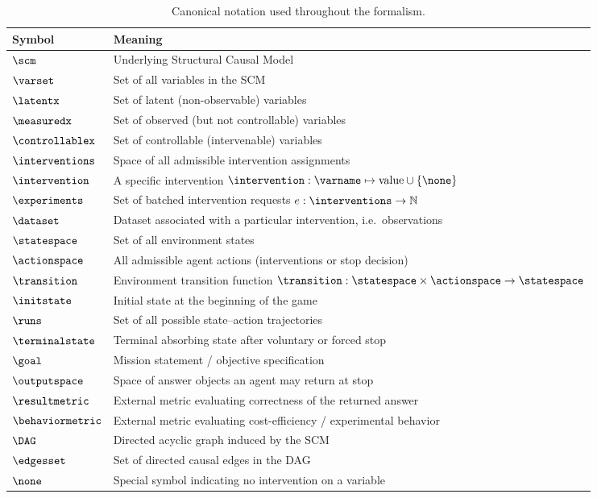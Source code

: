\begin{table}[h!]
\centering
\renewcommand{\arraystretch}{1.15}
\begin{tabular}{ll}
\toprule
\textbf{Symbol} & \textbf{Meaning} \\
\midrule
$\scm$ & Underlying Structural Causal Model \\
$\varset$ & Set of all variables in the SCM \\
$\latentx$ & Set of latent (non-observable) variables \\
$\measuredx$ & Set of observed (but not controllable) variables \\
$\controllablex$ & Set of controllable (intervenable) variables \\
$\interventions$ & Space of all admissible intervention assignments \\
$\intervention$ & A specific intervention $\intervention : \varname \mapsto \text{value} \cup \{\none\}$ \\
$\experiments$ & Set of batched intervention requests $e : \interventions \to \mathbb{N}$ \\
$\dataset$ & Dataset associated with a particular intervention, i.e.\ observations \\
$\statespace$ & Set of all environment states \\
$\actionspace$ & All admissible agent actions (interventions or stop decision) \\
$\transition$ & Environment transition function $\transition : \statespace \times \actionspace \to \statespace$ \\
$\initstate$ & Initial state at the beginning of the game \\
$\runs$ & Set of all possible state--action trajectories \\
$\terminalstate$ & Terminal absorbing state after voluntary or forced stop \\
$\goal$ & Mission statement / objective specification \\
$\outputspace$ & Space of answer objects an agent may return at stop \\
$\resultmetric$ & External metric evaluating correctness of the returned answer \\
$\behaviormetric$ & External metric evaluating cost-efficiency / experimental behavior \\
$\DAG$ & Directed acyclic graph induced by the SCM \\
$\edgesset$ & Set of directed causal edges in the DAG \\
$\none$ & Special symbol indicating no intervention on a variable \\
\bottomrule
\end{tabular}
\caption{Canonical notation used throughout the \game formalism.}
\end{table}

